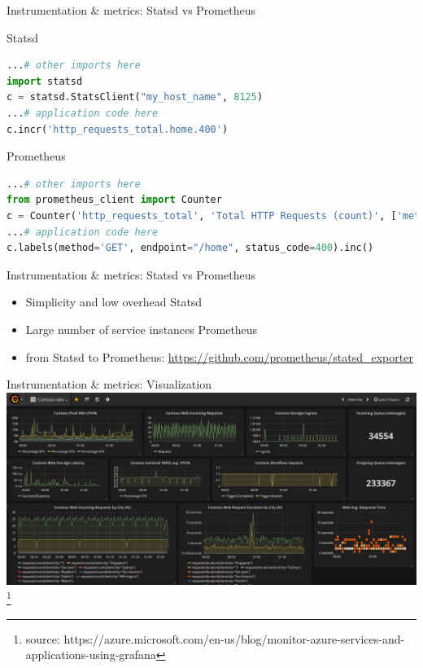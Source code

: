 \documentclass{beamer}
\newcommand\blfootnote[1]{%
  \begingroup
  \renewcommand\thefootnote{}\footnote{\tiny  #1 }%
  \addtocounter{footnote}{-1}%
  \endgroup
}
\begin{document}
\begin{frame}[fragile]{Instrumentation \& metrics: Statsd vs Prometheus}
	\begin{block}{Statsd}
	\begin{lstlisting}[language=python]
...# other imports here
import statsd
c = statsd.StatsClient("my_host_name", 8125)
...# application code here
c.incr('http_requests_total.home.400')
	\end{lstlisting}
	\end{block}
	
	\begin{block}{Prometheus}
	\begin{lstlisting}[language=python]
...# other imports here
from prometheus_client import Counter
c = Counter('http_requests_total', 'Total HTTP Requests (count)', ['method', 'endpoint', 'status_code'])
...# application code here
c.labels(method='GET', endpoint="/home", status_code=400).inc()
	\end{lstlisting}
	\end{block}
\end{frame}


\begin{frame}[fragile]{Instrumentation \& metrics: Statsd vs Prometheus}
	\begin{itemize}
		\item{Simplicity and low overhead \rightarrow Statsd}
		\item{Large number of service instances \rightarrow Prometheus} %
		\item{from Statsd to Prometheus: \url{https://github.com/prometheus/statsd_exporter}}
	\end{itemize}
\end{frame}


\begin{frame}{Instrumentation \& metrics: Visualization}
	\centering
	\includegraphics[width=.9\linewidth]{grafana_screenshot.png}
	\blfootnote{source: https://azure.microsoft.com/en-us/blog/monitor-azure-services-and-applications-using-grafana}
\end{frame}
\end{document}
